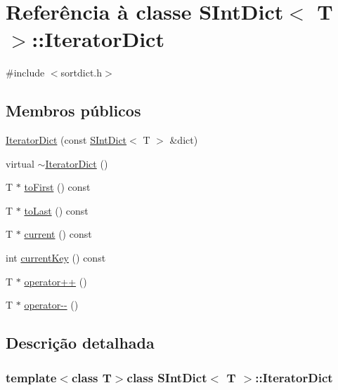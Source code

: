 \hypertarget{class_s_int_dict_1_1_iterator_dict}{\section{Referência à classe S\-Int\-Dict$<$ T $>$\-:\-:Iterator\-Dict}
\label{class_s_int_dict_1_1_iterator_dict}
}


{\ttfamily \#include $<$sortdict.\-h$>$}

\subsection*{Membros públicos}
\begin{DoxyCompactItemize}
\item 
\hyperlink{class_s_int_dict_1_1_iterator_dict_a9f5d0d4dc77ee768de45996cf8ae3dd5}{Iterator\-Dict} (const \hyperlink{class_s_int_dict}{S\-Int\-Dict}$<$ T $>$ \&dict)
\item 
virtual \hyperlink{class_s_int_dict_1_1_iterator_dict_a324edae396b1a9728b0fe0c61b4ae750}{$\sim$\-Iterator\-Dict} ()
\item 
T $\ast$ \hyperlink{class_s_int_dict_1_1_iterator_dict_ade77b001f496006e7017c1ec8620aeb3}{to\-First} () const 
\item 
T $\ast$ \hyperlink{class_s_int_dict_1_1_iterator_dict_a72d0e5c78c00ed44b21f29f12ae487e0}{to\-Last} () const 
\item 
T $\ast$ \hyperlink{class_s_int_dict_1_1_iterator_dict_ae616144a9897ce6137bce90597583bab}{current} () const 
\item 
int \hyperlink{class_s_int_dict_1_1_iterator_dict_a271363e05cfd14fdc3376c9d874de01c}{current\-Key} () const 
\item 
T $\ast$ \hyperlink{class_s_int_dict_1_1_iterator_dict_a47eb98449264b3d96cf72c29fa3e9049}{operator++} ()
\item 
T $\ast$ \hyperlink{class_s_int_dict_1_1_iterator_dict_af941a0327bceddd0cbce3539c100d54d}{operator-\/-\/} ()
\end{DoxyCompactItemize}


\subsection{Descrição detalhada}
\subsubsection*{template$<$class T$>$class S\-Int\-Dict$<$ T $>$\-::\-Iterator\-Dict}

